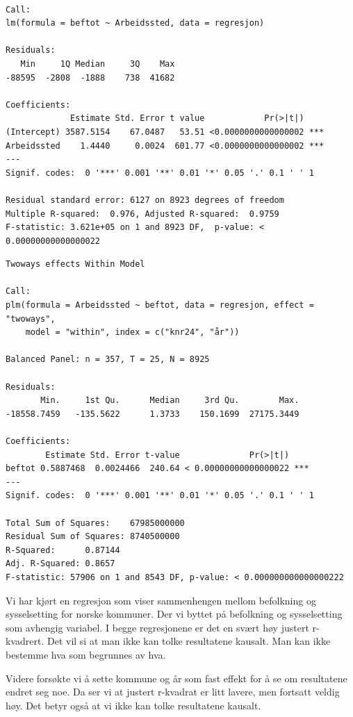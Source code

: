 \documentclass[
  norsk,
  letterpaper,
  DIV=11,
  numbers=noendperiod]{scrartcl}
\begin{document}
\begin{verbatim}

Call:
lm(formula = beftot ~ Arbeidssted, data = regresjon)

Residuals:
   Min     1Q Median     3Q    Max 
-88595  -2808  -1888    738  41682 

Coefficients:
             Estimate Std. Error t value            Pr(>|t|)    
(Intercept) 3587.5154    67.0487   53.51 <0.0000000000000002 ***
Arbeidssted    1.4440     0.0024  601.77 <0.0000000000000002 ***
---
Signif. codes:  0 '***' 0.001 '**' 0.01 '*' 0.05 '.' 0.1 ' ' 1

Residual standard error: 6127 on 8923 degrees of freedom
Multiple R-squared:  0.976, Adjusted R-squared:  0.9759 
F-statistic: 3.621e+05 on 1 and 8923 DF,  p-value: < 0.00000000000000022
\end{verbatim}

\begin{verbatim}
Twoways effects Within Model

Call:
plm(formula = Arbeidssted ~ beftot, data = regresjon, effect = "twoways", 
    model = "within", index = c("knr24", "år"))

Balanced Panel: n = 357, T = 25, N = 8925

Residuals:
       Min.     1st Qu.      Median     3rd Qu.        Max. 
-18558.7459   -135.5622      1.3733    150.1699  27175.3449 

Coefficients:
        Estimate Std. Error t-value              Pr(>|t|)    
beftot 0.5887468  0.0024466  240.64 < 0.00000000000000022 ***
---
Signif. codes:  0 '***' 0.001 '**' 0.01 '*' 0.05 '.' 0.1 ' ' 1

Total Sum of Squares:    67985000000
Residual Sum of Squares: 8740500000
R-Squared:      0.87144
Adj. R-Squared: 0.8657
F-statistic: 57906 on 1 and 8543 DF, p-value: < 0.000000000000000222
\end{verbatim}

Vi har kjørt en regresjon som viser sammenhengen mellom befolkning og
sysselsetting for norske kommuner. Der vi byttet på befolkning og
sysselsetting som avhengig variabel. I begge regresjonene er det en
svært høy justert r-kvadrert. Det vil si at man ikke kan tolke
resultatene kausalt. Man kan ikke bestemme hva som begrunnes av hva.

Videre forsøkte vi å sette kommune og år som fast effekt for å se om
resultatene endret seg noe. Da ser vi at justert r-kvadrat er litt
lavere, men fortsatt veldig høy. Det betyr også at vi ikke kan tolke
resultatene kausalt.
\end{document}
